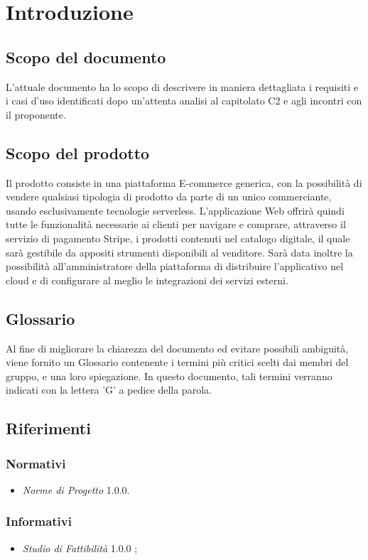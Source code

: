 \section{Introduzione}
\subsection{Scopo del documento}
L'attuale documento ha lo scopo di descrivere in maniera dettagliata i requisiti e i casi d'uso identificati dopo un'attenta analisi al capitolato C2 e agli incontri con il proponente.
\subsection{Scopo del prodotto}
Il prodotto consiste in una piattaforma E-commerce generica, con la possibilità di vendere qualsiasi tipologia di prodotto da parte di un unico commerciante, usando esclusivamente tecnologie serverless. L'applicazione Web offrirà quindi tutte le funzionalità necessarie ai clienti per navigare e comprare, attraverso il servizio di pagamento Stripe, i prodotti contenuti nel catalogo digitale, il quale sarà gestibile da appositi strumenti disponibili al venditore. Sarà data inoltre la possibilità all'amministratore della piattaforma di distribuire l'applicativo nel cloud e di configurare al meglio le integrazioni dei servizi esterni.
\subsection{Glossario}
Al fine di migliorare la chiarezza del documento ed evitare possibili ambiguità, viene fornito un Glossario contenente i termini più critici scelti dai membri del gruppo, e una loro spiegazione. In questo documento, tali termini verranno indicati con la lettera 'G' a pedice della parola.
\subsection{Riferimenti}
\subsubsection{Normativi}
\begin{itemize}
\item \textit{Norme di Progetto} 1.0.0.
\end{itemize}
\subsubsection{Informativi}
\begin{itemize}
\item \textit{Studio di Fattibilità} 1.0.0 ;

\end{itemize}